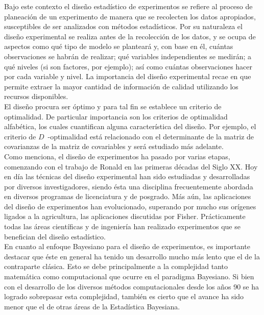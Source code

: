 Bajo este contexto el diseño estadístico de experimentos se refiere al proceso de planeación de un experimento de manera que se recolecten los datos apropiados, susceptibles de ser analizados con métodos estadísticos. Por su naturaleza el diseño experimental se realiza antes de la recolección de los datos, y se ocupa de aspectos como qué tipo de modelo se planteará y, con base en él, cuántas observaciones se habrán de realizar; qué variables independientes se medirán; a qué niveles (si son factores, por ejemplo); así como cuántas observaciones hacer por cada variable y nivel. La importancia del diseño experimental recae en que permite extraer la mayor cantidad de información de calidad utilizando los recursos disponibles. \\


El diseño procura ser óptimo y para tal fin se establece un criterio de optimalidad. De particular importancia son los criterios de optimalidad alfabética, los cuales cuantifican alguna característica del diseño. Por ejemplo, el criterio de $D$~-optimalidad está relacionado con el determinante de la matriz de covarianzas de la matriz de covariables \citep[Capítulo 14.4]{box_draper} y será estudiado más adelante. \\


Como \cite{montgomery_doe} menciona, el diseño de experimentos ha pasado por varias etapas, comenzando con el trabajo de Ronald \cite{fisher_doe} en las primeras décadas del Siglo XX. Hoy en día las técnicas del diseño experimental han sido estudiadas y desarrolladas por diversos investigadores, siendo ésta una disciplina frecuentemente abordada en diversos programas de licenciatura y de posgrado. Más aún, las aplicaciones del diseño de experimentos han evolucionado, superando por mucho sus orígenes ligados a la agricultura, las aplicaciones discutidas por Fisher. Prácticamente todas las áreas científicas y de ingeniería han realizado experimentos que se benefician del diseño estadístico. \\


En cuanto al enfoque Bayesiano para el diseño de experimentos, es importante destacar que éste en general ha tenido un desarrollo mucho más lento que el de la contraparte clásica. Esto se debe principalmente a la complejidad tanto matemática como computacional que ocurre en el paradigma Bayesiano. Si bien con el desarrollo de los diversos métodos computacionales desde los años 90 se ha logrado sobrepasar esta complejidad, también es cierto que el avance ha sido menor que el de otras áreas de la Estadística Bayesiana. \\


